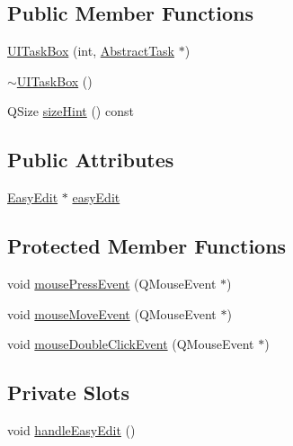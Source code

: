 \subsection*{Public Member Functions}
\begin{DoxyCompactItemize}
\item 
\hyperlink{class_do_lah_1_1_u_i_task_box_a187379180980160894962f615936e4f2}{U\+I\+Task\+Box} (int, \hyperlink{class_do_lah_1_1_abstract_task}{Abstract\+Task} $\ast$)
\item 
\hyperlink{class_do_lah_1_1_u_i_task_box_ad605fd9d79d40a9e1bddcb536164b9a9}{$\sim$\+U\+I\+Task\+Box} ()
\item 
Q\+Size \hyperlink{class_do_lah_1_1_u_i_task_box_a35d46c015e2e24a45cfa39667c2e2694}{size\+Hint} () const 
\end{DoxyCompactItemize}
\subsection*{Public Attributes}
\begin{DoxyCompactItemize}
\item 
\hyperlink{class_do_lah_1_1_easy_edit}{Easy\+Edit} $\ast$ \hyperlink{class_do_lah_1_1_u_i_task_box_a437fe635d4aee3ea4a6c371905b2e345}{easy\+Edit}
\end{DoxyCompactItemize}
\subsection*{Protected Member Functions}
\begin{DoxyCompactItemize}
\item 
void \hyperlink{class_do_lah_1_1_u_i_task_box_a878331142f2697c3f7b05d0e178bbb8e}{mouse\+Press\+Event} (Q\+Mouse\+Event $\ast$)
\item 
void \hyperlink{class_do_lah_1_1_u_i_task_box_a6f39cd480d09d9b2aeb66be6dfca809d}{mouse\+Move\+Event} (Q\+Mouse\+Event $\ast$)
\item 
void \hyperlink{class_do_lah_1_1_u_i_task_box_ab14d8bbe4b2eb598546e0b56cf60fe70}{mouse\+Double\+Click\+Event} (Q\+Mouse\+Event $\ast$)
\end{DoxyCompactItemize}
\subsection*{Private Slots}
\begin{DoxyCompactItemize}
\item 
void \hyperlink{class_do_lah_1_1_u_i_task_box_afa4159680d07191a6ed050391f77bfe1}{handle\+Easy\+Edit} ()
\end{DoxyCompactItemize}
